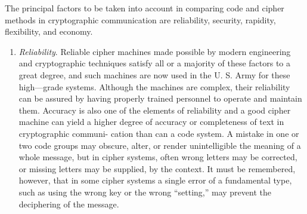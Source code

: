 \mypara The principal factors to be taken into account in comparing code
and cipher methods in cryptographic communication are reliability,
security, rapidity, ﬂexibility, and economy.
\begin{enumerate}

\item \textit{Reliability}. Reliable cipher machines made possible by modern
engineering and cryptographic techniques satisfy all or a
majority of these factors to a great degree, and such machines
are now used in the U. S. Army for these high—grade systems.
Although the machines are complex, their reliability can be
assured by having properly trained personnel to operate and
maintain them. Accuracy is also one of the elements of
reliability and a good cipher machine can yield a higher degree
of accuracy or completeness of text in cryptographic communi-
cation than can a code system. A mistake in one or two code
groups may obscure, alter, or render unintelligible the meaning
of a whole message, but in cipher systems, often wrong
letters may be corrected, or missing letters may be supplied,
by the context. It must be remembered, however, that in some
cipher systems a single error of a fundamental type, such as
using the wrong key or the wrong “setting,” may prevent the
deciphering of the message.


\end{enumerate}
